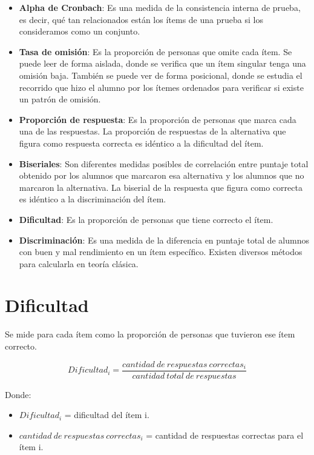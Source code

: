 \documentclass[
  letterpaper,
  DIV=11,
  numbers=noendperiod]{scrreprt}
\begin{document}
\begin{itemize}
\item
  \textbf{Alpha de Cronbach}: Es una medida de la consistencia interna
  de prueba, es decir, qué tan relacionados están los ítems de una
  prueba si los consideramos como un conjunto.
\item
  \textbf{Tasa de omisión}: Es la proporción de personas que omite cada
  ítem. Se puede leer de forma aislada, donde se verifica que un ítem
  singular tenga una omisión baja. También se puede ver de forma
  posicional, donde se estudia el recorrido que hizo el alumno por los
  ítemes ordenados para verificar si existe un patrón de omisión.
\item
  \textbf{Proporción de respuesta}: Es la proporción de personas que
  marca cada una de las respuestas. La proporción de respuestas de la
  alternativa que figura como respuesta correcta es idéntico a la
  dificultad del ítem.
\item
  \textbf{Biseriales}: Son diferentes medidas posibles de correlación
  entre puntaje total obtenido por los alumnos que marcaron esa
  alternativa y los alumnos que no marcaron la alternativa. La biserial
  de la respuesta que figura como correcta es idéntico a la
  discriminación del ítem.
\item
  \textbf{Dificultad}: Es la proporción de personas que tiene correcto
  el ítem.
\item
  \textbf{Discriminación}: Es una medida de la diferencia en puntaje
  total de alumnos con buen y mal rendimiento en un ítem específico.
  Existen diversos métodos para calcularla en teoría clásica.
\end{itemize}

\section{Dificultad}\label{dificultad}

Se mide para cada ítem como la proporción de personas que tuvieron ese
ítem correcto.

\[
Dificultad_i = \frac{cantidad\ de\ respuestas\ correctas_i}{cantidad\ total\ de\ respuestas}
\]

Donde:

\begin{itemize}
\item
  \(Dificultad_i\) = dificultad del ítem i.
\item
  \(cantidad\ de\ respuestas\ correctas_i\) = cantidad de respuestas
  correctas para el ítem i.
\end{itemize}
\end{document}
